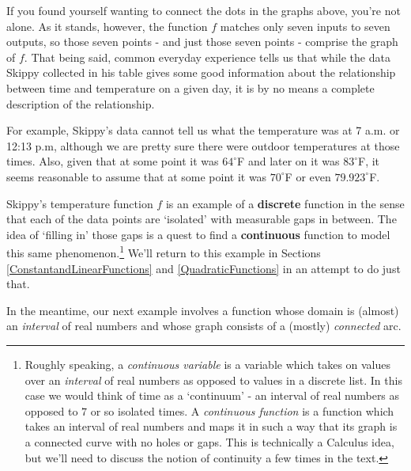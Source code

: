 \medskip

\label{firsttimewebreaktheaxis}

If you found yourself wanting to connect the dots in the graphs above, you're not alone.  As it stands, however, the function $f$ matches only seven inputs to seven outputs, so those seven points - and just those seven points - comprise the graph of $f$.  That being said, common everyday experience tells us that while the data Skippy collected in his table gives some good information about the relationship between time and temperature on a given day, it is by no means a complete description of the relationship.  

\medskip

For example, Skippy's data cannot tell us what the temperature was at 7 a.m. or 12:13 p.m, although we are pretty sure there were outdoor temperatures at those times.  Also, given that at some point it was $64^{\circ}$F and later on it was $83^{\circ}$F, it seems reasonable to assume that at some point it was $70^{\circ}$F or even $79.923^{\circ}$F.  

\medskip

Skippy's temperature function $f$ is an example of a  \textbf{discrete} function in the sense that each of the data points are `isolated' with measurable gaps in between.  The idea of `filling in' those gaps is a quest to find a  \textbf{continuous} function to model this same phenomenon.\footnote{Roughly speaking, a \textit{continuous variable} is a variable which takes on values over an \textit{interval} of real numbers as opposed to values in a discrete list. In this case we would think of time as a `continuum' - an interval of real numbers as opposed to $7$ or so isolated times.  A \textit{continuous function} is a function which takes an interval of real numbers and maps it in such a way that its graph is a connected curve with no holes or gaps. This is technically a Calculus idea, but we'll need to discuss the notion of continuity a few times in the text.} We'll return to this example in Sections \ref{ConstantandLinearFunctions} and \ref{QuadraticFunctions} in an attempt to do just that. 

\medskip

In the meantime, our next example involves a function whose domain is (almost) an \textit{interval} of real numbers and whose graph consists of a (mostly) \textit{connected} arc.


